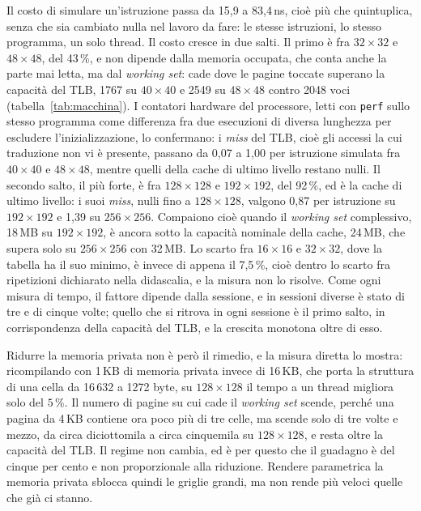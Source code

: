 Il costo di simulare un'istruzione passa da 15,9 a 83,4\,ns, cioè più che
quintuplica, senza che sia cambiato nulla nel lavoro da fare:
le stesse istruzioni, lo stesso programma, un solo thread. Il costo cresce in
due salti. Il primo è fra $32\times32$ e $48\times48$, del 43\,\%, e non dipende
dalla memoria occupata, che conta anche la parte mai letta, ma dal
\emph{working set}: cade dove le pagine toccate superano la capacità del TLB, 1767 su $40\times40$ e 2549 su $48\times48$ contro 2048 voci
(tabella~\ref{tab:macchina}). I contatori hardware del processore, letti con
\texttt{perf} sullo stesso programma come differenza fra due esecuzioni di
diversa lunghezza per escludere l'inizializzazione, lo confermano: i \emph{miss} del TLB, cioè gli accessi la cui traduzione non vi è presente, passano da 0,07 a 1,00 per istruzione simulata
fra $40\times40$ e $48\times48$, mentre quelli della cache di ultimo livello
restano nulli. Il secondo salto, il più forte, è fra $128\times128$ e
$192\times192$, del 92\,\%, ed è la cache di ultimo livello: i suoi \emph{miss},
nulli fino a $128\times128$, valgono 0,87 per istruzione su $192\times192$ e 1,39
su $256\times256$. Compaiono cioè quando il \emph{working set} complessivo, 18\,MB su $192\times192$, è ancora sotto la capacità nominale della cache, 24\,MB, che supera solo su $256\times256$ con 32\,MB. Lo scarto fra $16\times16$ e $32\times32$, dove la
tabella ha il suo minimo, è invece di appena il 7,5\,\%, cioè dentro lo
scarto fra ripetizioni dichiarato nella didascalia, e la misura non lo
risolve. Come ogni
misura di tempo, il
fattore dipende dalla sessione, e in sessioni diverse è stato di tre e di cinque
volte; quello che si ritrova in ogni sessione è il primo salto, in
corrispondenza della capacità del TLB, e la crescita
monotona oltre di esso.

Ridurre la memoria privata non è però il rimedio, e la misura diretta lo mostra:
ricompilando con 1\,KB di memoria privata invece di 16\,KB, che porta la
struttura di una cella da 16\,632 a 1272 byte, su $128\times128$ il tempo a un
thread migliora solo del $5\,\%$. Il numero di pagine su cui cade il
\emph{working set} scende, perché una pagina da 4\,KB contiene ora poco più di tre celle, ma
scende solo di tre volte e mezzo, da circa diciottomila a circa cinquemila su
$128\times128$, e resta oltre la capacità del TLB. Il
regime non cambia, ed è per questo che il guadagno è del cinque per cento e non
proporzionale alla riduzione. Rendere parametrica la memoria privata sblocca
quindi le griglie grandi, ma non rende più veloci quelle che già ci stanno.

